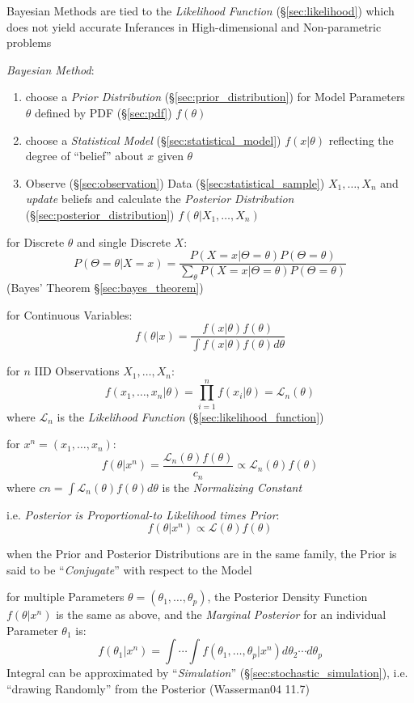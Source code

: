 \fist Bayesian Methods are tied to the \emph{Likelihood Function}
(\S\ref{sec:likelihood}) which does not yield accurate Inferances in
High-dimensional and Non-parametric problems

\emph{Bayesian Method}:
\begin{enumerate}
  \item choose a \emph{Prior Distribution} (\S\ref{sec:prior_distribution}) for
    Model Parameters $\theta$ defined by PDF (\S\ref{sec:pdf}) $f(\theta)$
  \item choose a \emph{Statistical Model} (\S\ref{sec:statistical_model})
    $f(x|\theta)$ reflecting the degree of ``belief'' about $x$ given $\theta$
  \item Observe (\S\ref{sec:observation}) Data (\S\ref{sec:statistical_sample})
    $X_1, \ldots, X_n$ and \emph{update} beliefs and calculate the
    \emph{Posterior Distribution} (\S\ref{sec:posterior_distribution})
    $f(\theta | X_1, \ldots, X_n)$
\end{enumerate}

for Discrete $\theta$ and single Discrete $X$:
\[
  P(\Theta = \theta | X = x) = \frac{
    P(X = x|\Theta = \theta)P(\Theta = \theta)
  }{
    \sum_\theta P(X = x | \Theta = \theta) P(\Theta = \theta)
  }
\]
(Bayes' Theorem \S\ref{sec:bayes_theorem})

for Continuous Variables:
\[
  f(\theta | x) = \frac{
    f(x|\theta)f(\theta)
  }{
    \int f(x|\theta)f(\theta) d\theta
  }
\]

for $n$ IID Observations $X_1, \ldots, X_n$:
\[
  f(x_1, \ldots, x_n | \theta) =
    \prod_{i=1}^n f(x_i | \theta) = \mathcal{L}_n(\theta)
\]
where $\mathcal{L}_n$ is the \emph{Likelihood Function}
(\S\ref{sec:likelihood_function})

for $x^n = (x_1, \ldots, x_n)$:
\[
  f(\theta|x^n) = \frac{\mathcal{L}_n(\theta)f(\theta)}{c_n}
    \propto \mathcal{L}_n(\theta)f(\theta)
\]
where $cn = \int \mathcal{L}_n(\theta)f(\theta) d\theta$ is the
\emph{Normalizing Constant}

i.e. \emph{Posterior is Proportional-to Likelihood times Prior}:
\[
  f(\theta | x^n) \propto \mathcal{L}(\theta)f(\theta)
\]

when the Prior and Posterior Distributions are in the same family, the Prior is
said to be ``\emph{Conjugate}'' with respect to the Model

for multiple Parameters $\theta = (\theta_1, \ldots, \theta_p)$, the Posterior
Density Function $f(\theta|x^n)$ is the same as above, and the \emph{Marginal
  Posterior} for an individual Parameter $\theta_1$ is:
\[
  f(\theta_1 | x^n) =
    \int\cdots\int f(\theta_1,\ldots,\theta_p | x^n) d\theta_2 \cdots d\theta_p
\]
Integral can be approximated by ``\emph{Simulation}''
(\S\ref{sec:stochastic_simulation}), i.e. ``drawing Randomly'' from the
Posterior (Wasserman04 11.7)



